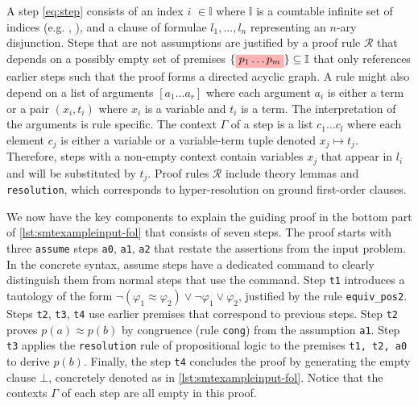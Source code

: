 A step \cref{eq:step} consists of an index \colorbox{indexClr!30}{$i$} $\in \mathbb{I}$ where $\mathbb{I}$ is a countable infinite set of indices (e.g. , ), and a clause of formulae \colorbox{green!30}{$l_1, \dots, l_n$} representing an $n$-ary disjunction. Steps that are not assumptions are justified by a proof rule \colorbox{purple!30}{$\mathcal{R}$} that depends on a possibly empty set of premises $\{\colorbox{red!30}{$p_1 \dots  p_m$}\} \subseteq \mathbb{I}$ that only references earlier steps such that the proof forms
a directed acyclic graph. A rule might also depend on a list of arguments \colorbox{orange!30}{$[a_1 \dots a_r]$} where each argument $a_i$ is either a term or a pair $(x_i, t_i)$ where $x_i$ is a variable and $t_i$ is a term. The interpretation of the arguments is rule specific. The context \colorbox{blue!30}{$\Gamma$} of a step is a list $c_1 \dots c_l $ where each element $c_j$ is either a variable or a variable-term tuple denoted $x_j \mapsto t_j$. Therefore, steps with a non-empty context contain variables $x_j$ that appear in \colorbox{green!30}{$l_i$} and will be substituted by $t_j$. Proof rules \colorbox{purple!30}{$\mathcal{R}$} include theory lemmas and \texttt{resolution}, which corresponds to hyper-resolution on ground first-order clauses.

We now have the key components to explain the guiding proof in the bottom part of \cref{lst:smtexampleinput-fol} that consists of seven steps. The proof starts with three \texttt{assume} steps \texttt{a0}, \texttt{a1}, \texttt{a2} that restate the assertions from the input problem.
In the concrete syntax, assume steps have a dedicated command  to clearly distinguish them from normal steps that use the  command.
Step \texttt{t1} introduces a tautology of the form $\neg (\varphi_1 \approx \varphi_2) \lor \neg \varphi_1 \lor \varphi_2$, justified by the rule \colorbox{purple!30}{\texttt{equiv\_pos2}}. Steps \texttt{t2}, \texttt{t3}, \texttt{t4} use earlier premises that correspond to previous steps. Step \texttt{t2} proves $p(a) \approx p(b)$ by congruence (rule \colorbox{purple!30}{\texttt{cong}}) from the assumption \texttt{a1}.
Step \texttt{t3} applies the \colorbox{purple!30}{\texttt{resolution}} rule of propositional logic to the premises \texttt{t1, t2, a0} to derive $p(b)$. Finally, the step \texttt{t4} concludes the proof by generating the empty clause $\bot$, concretely denoted as  in \cref{lst:smtexampleinput-fol}. %
Notice that the contexts \colorbox{blue!30}{$\Gamma$} of each step are all empty in this proof.

